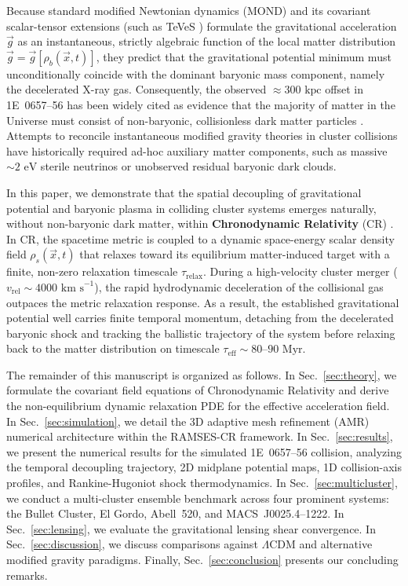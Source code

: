 \documentclass[aps,prd,reprint,superscriptaddress,nofootinbib,floatfix,amsmath,amssymb]{revtex4-2}
\begin{document}
Because standard modified Newtonian dynamics (MOND) \cite{Milgrom1983} and its covariant scalar-tensor extensions (such as TeVeS \cite{Bekenstein2004}) formulate the gravitational acceleration $\vec{g}$ as an instantaneous, strictly algebraic function of the local matter distribution $\vec{g} = \vec{g}[\rho_b(\vec{x}, t)]$, they predict that the gravitational potential minimum must unconditionally coincide with the dominant baryonic mass component, namely the decelerated X-ray gas. Consequently, the observed $\approx 300\text{ kpc}$ offset in 1E~0657--56 has been widely cited as evidence that the majority of matter in the Universe must consist of non-baryonic, collisionless dark matter particles \cite{Clowe2006_Bullet}. Attempts to reconcile instantaneous modified gravity theories in cluster collisions have historically required ad-hoc auxiliary matter components, such as massive $\sim 2\text{ eV}$ sterile neutrinos \cite{Angus2007} or unobserved residual baryonic dark clouds.

In this paper, we demonstrate that the spatial decoupling of gravitational potential and baryonic plasma in colliding cluster systems emerges naturally, without non-baryonic dark matter, within \textbf{Chronodynamic Relativity} (CR) \cite{Shreve2026_Foundations,Shreve2026_TemporalDissipation}. In CR, the spacetime metric is coupled to a dynamic space-energy scalar density field $\rho_s(\vec{x}, t)$ that relaxes toward its equilibrium matter-induced target with a finite, non-zero relaxation timescale $\tau_{\text{relax}}$. During a high-velocity cluster merger ($v_{\text{rel}} \sim 4000\text{ km s}^{-1}$), the rapid hydrodynamic deceleration of the collisional gas outpaces the metric relaxation response. As a result, the established gravitational potential well carries finite temporal momentum, detaching from the decelerated baryonic shock and tracking the ballistic trajectory of the system before relaxing back to the matter distribution on timescale $\tau_{\text{eff}} \sim 80\text{--}90\text{ Myr}$.

The remainder of this manuscript is organized as follows. In Sec.~\ref{sec:theory}, we formulate the covariant field equations of Chronodynamic Relativity and derive the non-equilibrium dynamic relaxation PDE for the effective acceleration field. In Sec.~\ref{sec:simulation}, we detail the 3D adaptive mesh refinement (AMR) numerical architecture within the RAMSES-CR framework. In Sec.~\ref{sec:results}, we present the numerical results for the simulated 1E~0657--56 collision, analyzing the temporal decoupling trajectory, 2D midplane potential maps, 1D collision-axis profiles, and Rankine-Hugoniot shock thermodynamics. In Sec.~\ref{sec:multicluster}, we conduct a multi-cluster ensemble benchmark across four prominent systems: the Bullet Cluster, El Gordo, Abell~520, and MACS~J0025.4--1222. In Sec.~\ref{sec:lensing}, we evaluate the gravitational lensing shear convergence. In Sec.~\ref{sec:discussion}, we discuss comparisons against $\Lambda\text{CDM}$ and alternative modified gravity paradigms. Finally, Sec.~\ref{sec:conclusion} presents our concluding remarks.
\end{document}
